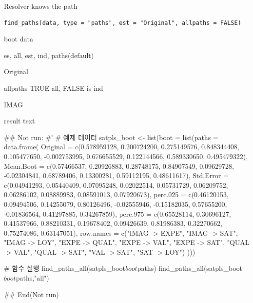 \documentclass[a4paper]{book}
\begin{document}
%
\begin{Description}
Resolver knows the path
\end{Description}
%
\begin{Usage}
\begin{verbatim}
find_paths(data, type = "paths", est = "Original", allpaths = FALSE)
\end{verbatim}
\end{Usage}
%
\begin{Arguments}
\begin{ldescription}
\item[\code{data}] boot data

\item[\code{type}] es, all, est, ind, paths(default)

\item[\code{est}] Original

\item[\code{allpaths}] allpaths TRUE all, FALSE is ind

\item[\code{start}] IMAG
\end{ldescription}
\end{Arguments}
%
\begin{Value}
result text
\end{Value}
%
\begin{Examples}
\begin{ExampleCode}

## Not run: 
#'
# 예제 데이터
satpls_boot <- list(boot = list(paths = data.frame(
  Original = c(0.578959128, 0.200724200, 0.275149576,
  0.848344408, 0.105477650, -0.002753995,
  0.676655529, 0.122144566, 0.589330650, 0.495479322),
  Mean.Boot = c(0.57466537, 0.20926883,
  0.28748175, 0.84907549, 0.09629728,
  -0.02304841, 0.68789406, 0.13300281,
  0.59112195, 0.48611617),
  Std.Error = c(0.04941293, 0.05440409,
   0.07095248, 0.02022514, 0.05731729,
   0.06209752, 0.06286102, 0.08889983,
   0.08591013, 0.07920673),
  perc.025 = c(0.46120153, 0.09494506,
  0.14255079, 0.80126496, -0.02555946,
  -0.15182035, 0.57655200, -0.01836564,
   0.41297885, 0.34267859),
  perc.975 = c(0.65528114, 0.30696127,
   0.41537966, 0.88210331, 0.19678402,
   0.09426639, 0.81986383, 0.32270662,
    0.75274086, 0.63147051),
  row.names = c("IMAG -> EXPE",
  "IMAG -> SAT",
   "IMAG -> LOY", "EXPE -> QUAL",
   "EXPE -> VAL", "EXPE -> SAT",
   "QUAL -> VAL", "QUAL -> SAT",
   "VAL -> SAT", "SAT -> LOY")
)))

# 함수 실행
find_paths_all(satpls_boot$boot$paths)
find_paths_all(satpls_boot$boot$paths,"all")

## End(Not run)

\end{ExampleCode}
\end{Examples}
\end{document}
